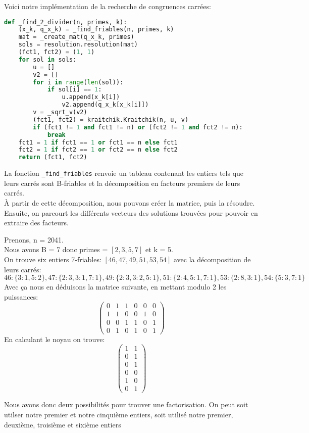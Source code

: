 Voici notre implémentation de la recherche de congruences carrées:
\begin{lstlisting}[language=Python]
def _find_2_divider(n, primes, k):
	(x_k, q_x_k) = _find_friables(n, primes, k)
	mat = _create_mat(q_x_k, primes)
	sols = resolution.resolution(mat)
	(fct1, fct2) = (1, 1)
	for sol in sols:
		u = []
		v2 = []
		for i in range(len(sol)):
			if sol[i] == 1:
				u.append(x_k[i])
				v2.append(q_x_k[x_k[i]])
		v = _sqrt_v(v2)
		(fct1, fct2) = kraitchik.Kraitchik(n, u, v)
		if (fct1 != 1 and fct1 != n) or (fct2 != 1 and fct2 != n):
			break
	fct1 = 1 if fct1 == 1 or fct1 == n else fct1
	fct2 = 1 if fct2 == 1 or fct2 == n else fct2
	return (fct1, fct2)
\end{lstlisting}
\vspace{1em}
La fonction \lstinline{_find_friables} renvoie un tableau contenant les entiers tels que leurs carrés sont B-friables et la décomposition en facteurs premiers de leurs carrés. \\
À partir de cette décomposition, nous pouvons créer la matrice, puis la résoudre.
Ensuite, on parcourt les différents vecteurs des solutions trouvées pour pouvoir en extraire des facteurs.

\begin{example}
    Prenons, n = 2041.\\ 
    Nous avons B = 7 donc primes = $[2, 3, 5, 7]$ et k = 5.\\
    On trouve six entiers 7-friables: $[46, 47, 49, 51, 53, 54]$
    avec la décomposition de leurs carrés: \[{46:\{3: 1, 5: 2\}, 47:\{2: 3, 3: 1, 7: 1\}, 49:\{2: 3, 3: 2, 5: 1\},51: \{2: 4, 5: 1, 7: 1\},53: \{2: 8, 3: 1\},54: \{5: 3, 7: 1\}}\]
    Avec ça nous en déduisons la matrice suivante, en mettant modulo 2 les puissances:
    \[\begin{pmatrix}
        0 & 1 & 1 & 0 & 0 & 0\\
        1 & 1 & 0 & 0 & 1 & 0\\
        0 & 0 & 1 & 1 & 0 & 1\\
        0 & 1 & 0 & 1 & 0 & 1
    \end{pmatrix}\]
    En calculant le noyau on trouve:
    \[\begin{pmatrix}
        1 & 1\\
        0 & 1\\
        0 & 1\\
        0 & 0\\
        1 & 0\\
        0 & 1
    \end{pmatrix}\]

    Nous avons donc deux possibilités pour trouver une factorisation.
    On peut soit utilser notre premier et notre cinquième entiers, soit utilisé notre premier, deuxième, troisième et sixième entiers
\end{example}